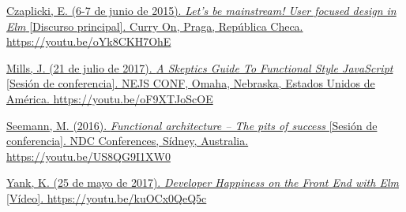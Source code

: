 \documentclass{article}
\begin{document}
\begin{thebibliography}{99}
 \href{https://youtu.be/oYk8CKH7OhE}{Czaplicki, E. (6-7 de junio de 2015). \textit{Let's be mainstream! User focused design in Elm} [Discurso principal]. Curry On, Praga, República Checa. https://youtu.be/oYk8CKH7OhE}

 \href{https://youtu.be/oF9XTJoScOE}{Mills, J. (21 de julio de 2017). \textit{A Skeptics Guide To Functional Style JavaScript} [Sesión de conferencia]. NEJS CONF, Omaha, Nebraska, Estados Unidos de América. https://youtu.be/oF9XTJoScOE}

 \href{https://youtu.be/US8QG9I1XW0}{Seemann, M. (2016). \textit{Functional architecture – The pits of success} [Sesión de conferencia]. NDC Conferences, Sídney, Australia. https://youtu.be/US8QG9I1XW0}

 \href{https://youtu.be/kuOCx0QeQ5c}{Yank, K. (25 de mayo de 2017). \textit{Developer Happiness on the Front End with Elm} [Vídeo]. https://youtu.be/kuOCx0QeQ5c}
\end{thebibliography}
\end{document}
